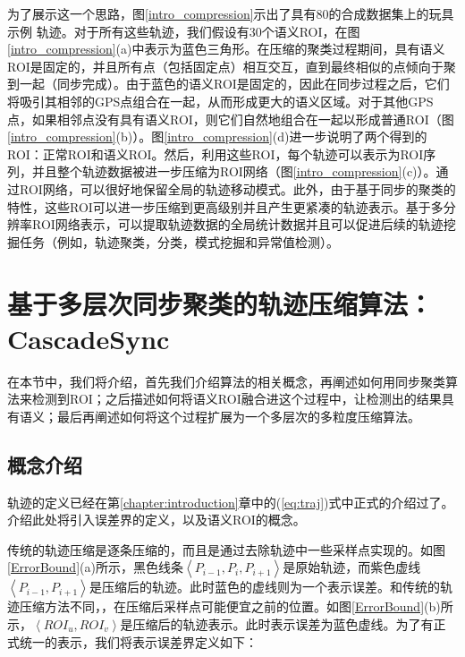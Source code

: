 为了展示这一个思路，图\ref{intro_compression}示出了具有80的合成数据集上的玩具示例
轨迹。对于所有这些轨迹，我们假设有30个语义ROI，在图\ref{intro_compression}(a)中表示为蓝色三角形。在压缩的聚类过程期间，具有语义ROI是固定的，并且所有点（包括固定点）相互交互，直到最终相似的点倾向于聚到一起（同步完成）。由于蓝色的语义ROI是固定的，因此在同步过程之后，它们将吸引其相邻的GPS点组合在一起，从而形成更大的语义区域。对于其他GPS点，如果相邻点没有具有语义ROI，则它们自然地组合在一起以形成普通ROI（图\ref{intro_compression}(b)）。图\ref{intro_compression}(d)进一步说明了两个得到的ROI：正常ROI和语义ROI。然后，利用这些ROI，每个轨迹可以表示为ROI序列，并且整个轨迹数据被进一步压缩为ROI网络（图\ref{intro_compression}(c)）。通过ROI网络，可以很好地保留全局的轨迹移动模式。此外，由于基于同步的聚类的特性，这些ROI可以进一步压缩到更高级别并且产生更紧凑的轨迹表示。基于多分辨率ROI网络表示，可以提取轨迹数据的全局统计数据并且可以促进后续的轨迹挖掘任务（例如，轨迹聚类，分类，模式挖掘和异常值检测）。

\section{基于多层次同步聚类的轨迹压缩算法：CascadeSync}
在本节中，我们将介绍，首先我们介绍算法的相关概念，再阐述如何用同步聚类算法来检测到ROI；之后描述如何将语义ROI融合进这个过程中，让检测出的结果具有语义；最后再阐述如何将这个过程扩展为一个多层次的多粒度压缩算法。


\subsection{概念介绍}
轨迹的定义已经在第\ref{chapter:introduction}章中的(\ref{eq:traj})式中正式的介绍过了。介绍此处将引入误差界的定义，以及语义ROI的概念。


传统的轨迹压缩是逐条压缩的，而且是通过去除轨迹中一些采样点实现的。如图\ref{ErrorBound}(a)所示，黑色线条$\left<P_{i-1},P_{i},P_{i+1}\right>$是原始轨迹，而紫色虚线$\left<P_{i-1},P_{i+1}\right>$是压缩后的轨迹。此时蓝色的虚线则为一个表示误差。和传统的轨迹压缩方法不同，，在压缩后采样点可能便宜之前的位置。如图\ref{ErrorBound}(b)所示，$\left<ROI_{u},ROI_{v}\right>$是压缩后的轨迹表示。此时表示误差为蓝色虚线。为了有正式统一的表示，我们将表示误差界定义如下：

